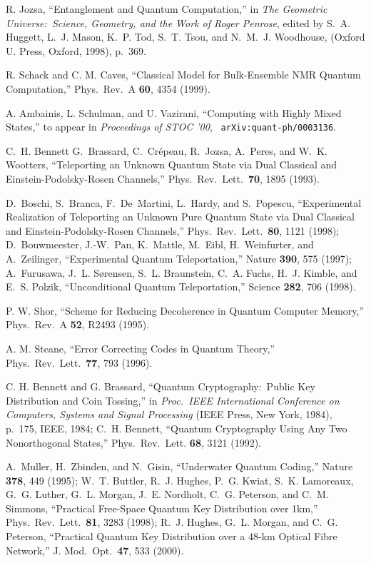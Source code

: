 \documentclass[12pt,aps,eqsecnum]{revtex4-1}
\begin{document}
\begin{thebibliography}{10}
R. Jozsa, ``Entanglement and Quantum Computation,'' in {\sl The
Geometric Universe:\ Science, Geometry, and the Work of Roger
Penrose}, edited by S.~A. Huggett, L.~J. Mason, K.~P. Tod, S.~T.
Tsou, and N.~M.~J. Woodhouse, (Oxford U. Press, Oxford, 1998),
p.~369.

R. Schack and C. M. Caves, ``Classical Model for Bulk-Ensemble NMR
Quantum Computation,'' Phys.\ Rev.\ A {\bf 60}, 4354 (1999).

A. Ambainis, L. Schulman, and U. Vazirani, ``Computing with Highly
Mixed States,'' to appear in {\sl Proceedings of STOC '00\/}, {\tt
arXiv:quant-ph/0003136}.

C.~H. Bennett G.~Brassard, C.~Cr\'{e}peau, R.~Jozsa, A.~Peres, and
W.~K. Wootters, ``Teleporting an Unknown Quantum State via Dual
Classical and Einstein-Podolsky-Rosen Channels,'' Phys.\ Rev.\
Lett.\ {\bf 70}, 1895 (1993).

D.~Boschi, S.~Branca, F.~De~Martini, L.~Hardy, and S.~Popescu,
``Experimental Realization of Teleporting an Unknown Pure Quantum
State via Dual Classical and Einstein-Podolsky-Rosen Channels,''
Phys.\ Rev.\ Lett.\ {\bf 80}, 1121 (1998); D.~Bouwmeester,
J.-W.~Pan, K.~Mattle, M.~Eibl, H.~Weinfurter, and A.~Zeilinger,
``Experimental Quantum Teleportation,'' Nature {\bf 390}, 575
(1997); A.~Furusawa, J.~L. S{\o}rensen, S.~L. Braunstein, C.~A.
Fuchs, H.~J. Kimble, and E.~S. Polzik, ``Unconditional Quantum
Teleportation,'' Science {\bf 282}, 706 (1998).

P. W. Shor, ``Scheme for Reducing Decoherence in Quantum Computer
Memory,'' Phys.\ Rev.\ A {\bf 52}, R2493 (1995).

A. M. Steane, ``Error Correcting Codes in Quantum Theory,'' Phys.\
Rev.\ Lett.\ {\bf 77}, 793 (1996).

C. H. Bennett and G. Brassard, ``Quantum Cryptography:\ Public Key
Distribution and Coin Tossing,'' in {\sl Proc.\ IEEE International
Conference on Computers, Systems and Signal Processing\/} (IEEE
Press, New York, 1984), p.~175, IEEE, 1984; C.~H. Bennett, ``Quantum
Cryptography Using Any Two Nonorthogonal States,'' Phys.\ Rev.\
Lett. {\bf 68}, 3121 (1992).

\bibitem{CryptoExperiments}
A.~Muller, H.~Zbinden, and N.~Gisin, ``Underwater Quantum Coding,''
Nature {\bf 378}, 449 (1995);  W.~T. Buttler, R.~J. Hughes, P.~G.
Kwiat, S.~K. Lamoreaux, G.~G. Luther, G.~L. Morgan, J.~E. Nordholt,
C.~G. Peterson, and C.~M. Simmons, ``Practical Free-Space Quantum Key
Distribution over 1km,'' Phys.\ Rev.\ Lett.\ {\bf 81}, 3283 (1998);
R.~J. Hughes, G.~L. Morgan, and C.~G. Peterson, ``Practical Quantum
Key Distribution over a 48-km Optical Fibre Network,'' J. Mod.\ Opt.\
{\bf 47}, 533 (2000).


\end{thebibliography}
\end{document}
